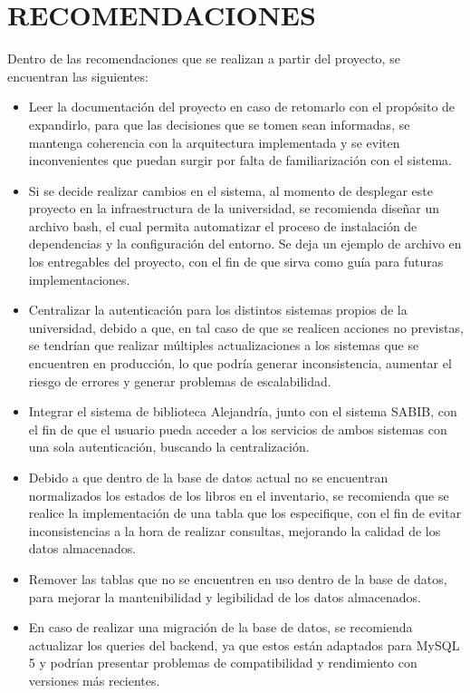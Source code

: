\documentclass[spanish]{ieee_upb}
\begin{document}
\section{RECOMENDACIONES}
Dentro de las recomendaciones que se realizan a partir del proyecto, se encuentran las siguientes:
\begin{itemize}
  \item Leer la documentación del proyecto en caso de retomarlo con el propósito de expandirlo, para que las decisiones que se tomen sean informadas, se mantenga coherencia con la arquitectura implementada y se eviten inconvenientes que puedan surgir por falta de familiarización con el sistema.
  \item Si se decide realizar cambios en el sistema, al momento de desplegar este proyecto en la infraestructura de la universidad, se recomienda diseñar un archivo bash, el cual permita automatizar el proceso de instalación de dependencias y la configuración del entorno. Se deja un ejemplo de archivo en los entregables del proyecto, con el fin de que sirva como guía para futuras implementaciones.
  \item Centralizar la autenticación para los distintos sistemas propios de la universidad, debido a que, en tal caso de que se realicen acciones no previstas, se tendrían que realizar múltiples actualizaciones a los sistemas que se encuentren en producción, lo que podría generar inconsistencia, aumentar el riesgo de errores y generar problemas de escalabilidad.
  \item Integrar el sistema de biblioteca Alejandría, junto con el sistema SABIB, con el fin de que el usuario pueda acceder a los servicios de ambos sistemas con una sola autenticación, buscando la centralización.
  \item Debido a que dentro de la base de datos actual no se encuentran normalizados los estados de los libros en el inventario, se recomienda que se realice la implementación de una tabla que los especifique, con el fin de evitar inconsistencias a la hora de realizar consultas, mejorando la calidad de los datos almacenados.
  \item Remover las tablas que no se encuentren en uso dentro de la base de datos, para mejorar la mantenibilidad y legibilidad de los datos almacenados.
  \item En caso de realizar una migración de la base de datos, se recomienda actualizar los queries del backend, ya que estos están adaptados para MySQL 5 y podrían presentar problemas de compatibilidad y rendimiento con versiones más recientes.
\end{itemize}
\end{document}
